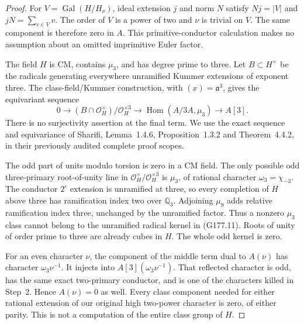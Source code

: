 \begin{proof}
For $V=\operatorname{Gal}(H/H_\nu)$, ideal extension $j$ and norm
$N$ satisfy $Nj=|V|$ and $jN=\sum_{v\in V}v$.
The order of $V$ is a power of two and $\nu$ is trivial on $V$.
The same component is therefore zero in $A$.
This primitive-conductor calculation makes no assumption about
an omitted imprimitive Euler factor.

The field $H$ is CM, contains $\mu_3$, and has degree prime to three.
Let $B\subset H^\times$ be the radicals generating everywhere
unramified Kummer extensions of exponent three.
The class-field/Kummer construction, with $(x)=\mathfrak a^3$,
gives the equivariant sequence
\[
 0\longrightarrow
 (B\cap\mathcal O_H^\times)/\mathcal O_H^{\times3}
 \longrightarrow\operatorname{Hom}(A/3A,\mu_3)
 \longrightarrow A[3].
 \tag{G177.11}
\]
There is no surjectivity assertion at the final term.
We use the exact sequence and equivariance of Sharifi,
Lemma~1.4.6, Proposition~1.3.2 and Theorem~4.4.2, in their
previously audited complete proof scopes.

The odd part of units modulo torsion is zero in a CM field.
The only possible odd three-primary root-of-unity line in
$\mathcal O_H^\times/\mathcal O_H^{\times3}$ is $\mu_3$,
of rational character $\omega_3=\chi_{-3}$.
The conductor $2^c$ extension is unramified at three, so every
completion of $H$ above three has ramification index two over
$\mathbb Q_3$.  Adjoining $\mu_9$ adds relative ramification
index three, unchanged by the unramified factor.
Thus a nonzero $\mu_3$ class cannot belong to the unramified
radical kernel in (G177.11).  Roots of unity of order prime to
three are already cubes in $H$.  The whole odd kernel is zero.

For an even character $\nu$, the component of the middle term
dual to $A(\nu)$ has character $\omega_3\nu^{-1}$.
It injects into $A[3](\omega_3\nu^{-1})$.
That reflected character is odd, has the same exact two-primary
conductor, and is one of the characters killed in Step~2.
Hence $A(\nu)=0$ as well.
Every class component needed for either rational extension of
our original high two-power character is zero, of either parity.
This is not a computation of the entire class group of $H$.


\end{proof}
